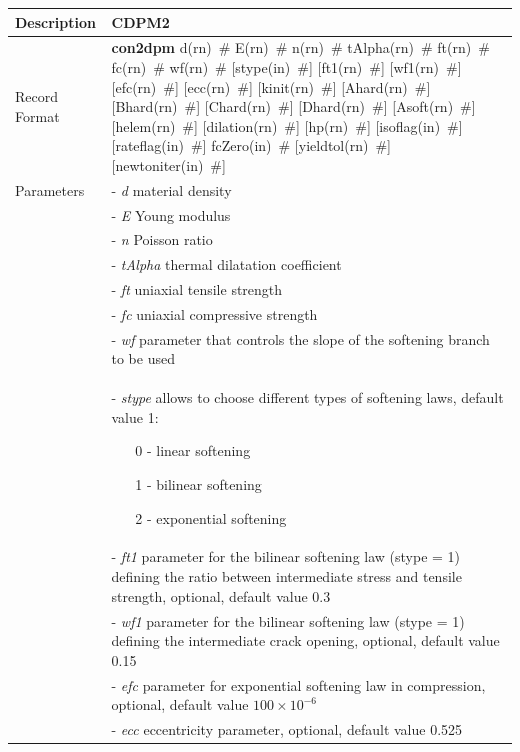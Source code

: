 \documentclass[a4paper]{article}
\newcommand{\descitem}[1]{{\noindent \bf #1}}
\newcommand{\elemparam}[2]{{{#1\tiny (#2)}~\#}}
\newcommand{\param}[1]{{\it #1}}
\newenvironment{mmt}{\begin{tabular}{|l|p{9cm}|}}{\end{tabular}\\}
\newenvironment{mmt}{\begin{tabular}{|l|l|}}{\end{tabular}\\}
\begin{document}
\begin{table}[!htb]
\begin{mmt}
\hline
Description & CDPM2\\
\hline
Record Format & \descitem{con2dpm}  \elemparam{d}{rn} \elemparam{E}{rn} \elemparam{n}{rn} \elemparam{tAlpha}{rn} \elemparam{ft}{rn} \elemparam{fc}{rn} \elemparam{wf}{rn} [\elemparam{stype}{in}] [\elemparam{ft1}{rn}] [\elemparam{wf1}{rn}] [\elemparam{efc}{rn}] [\elemparam{ecc}{rn}] [\elemparam{kinit}{rn}] [\elemparam{Ahard}{rn}] [\elemparam{Bhard}{rn}] [\elemparam{Chard}{rn}] [\elemparam{Dhard}{rn}] [\elemparam{Asoft}{rn}] [\elemparam{helem}{rn}] [\elemparam{dilation}{rn}] [\elemparam{hp}{rn}] [\elemparam{isoflag}{in}] [\elemparam{rateflag}{in}] \elemparam{fcZero}{in} [\elemparam{yieldtol}{rn}] [\elemparam{newtoniter}{in}] \\
Parameters &- \param{d} material density\\
&- \param{E} Young modulus\\
&- \param{n} Poisson ratio\\
&- \param{tAlpha} thermal dilatation coefficient\\
&- \param{ft} uniaxial tensile strength\\
&- \param{fc} uniaxial compressive strength\\
&- \param{wf} parameter that controls the slope of the softening branch to be used\\
&- \param{stype} allows to choose different types of softening laws, default value 1:
\begin{itemize}\setlength{\itemsep}{-3pt}
\item[0 -] linear softening 
\item[1 -] bilinear softening
\item[2 -] exponential softening
\end{itemize}\\
&- \param{ft1}  parameter for the bilinear softening law (stype = 1) defining the ratio between intermediate stress and tensile strength, optional, default value 0.3\\
&- \param{wf1}  parameter for the bilinear softening law (stype = 1) defining the intermediate crack opening, optional, default value 0.15\\
&- \param{efc}  parameter for exponential softening law in compression, optional, default value $100 \times 10^{-6}$\\
&- \param{ecc} eccentricity parameter, optional, default value 0.525\\

\end{mmt}
\end{table}
\end{document}

